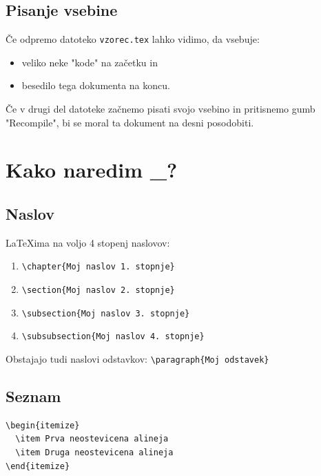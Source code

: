 \documentclass[a4paper, 12pt]{report}
\begin{document}
\section{Pisanje vsebine}

Če odpremo datoteko \texttt{vzorec.tex} lahko vidimo, da vsebuje:

\begin{itemize}
  \item veliko neke "kode" na začetku in
  \item besedilo tega dokumenta na koncu.
\end{itemize}

Če v drugi del datoteke začnemo pisati svojo vsebino in pritisnemo gumb "Recompile", bi se moral ta dokument na desni posodobiti.

\chapter{Kako naredim \_?}

\section{Naslov}

\LaTeX ima na voljo 4 stopenj naslovov:

\begin{enumerate}
  \item \texttt{\textbackslash chapter\{Moj naslov 1. stopnje\} }
  \item \texttt{\textbackslash section\{Moj naslov 2. stopnje\} }
  \item \texttt{\textbackslash subsection\{Moj naslov 3. stopnje\} }
  \item \texttt{\textbackslash subsubsection\{Moj naslov 4. stopnje\} }
\end{enumerate}

Obstajajo tudi naslovi odstavkov: \texttt{\textbackslash paragraph\{Moj odstavek\} }

\section{Seznam}

\begin{verbatim}
\begin{itemize}
  \item Prva neostevicena alineja
  \item Druga neostevicena alineja
\end{itemize}
\end{verbatim}
\end{document}
